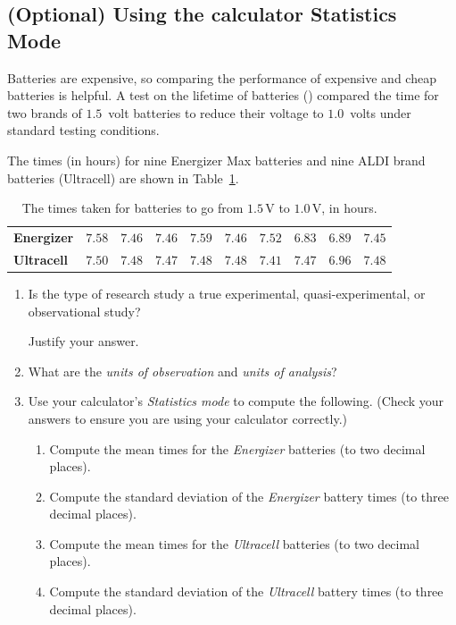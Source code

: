 \documentclass[
  11pt,
  a4paper,
  krantz2]{krantz}
\providecommand{\tightlist}{%
  \setlength{\itemsep}{0pt}\setlength{\parskip}{0pt}}
\newlength{\greyboxheight}
\newcommand{\setgreyboxheight}[1]{%
  \setlength{\greyboxheight}{2.3\baselineskip * #1}%
}
\newenvironment{greybox}[1]{%
  \nopagebreak
  \setgreyboxheight{#1}%
  \begin{tcolorbox}[
    colframe=gray!30!black,
    boxrule=2pt,
    width=\linewidth,
    height=\greyboxheight,
    valign=center,
    colback=white,
    left=4pt,
    right=4pt, 
    top=4pt, 
    bottom=4pt,
    before skip=4pt,
    after skip=4pt
  ]
\vspace*{\greyboxheight} %
}{%
  \end{tcolorbox}
  \goodbreak
}
\newcommand{\greyboxlines}[1]{\noindent\begin{greybox}{#1}\end{greybox}}
\begin{document}
\subsection{\texorpdfstring{\textbf{(Optional)} Using the calculator Statistics Mode}{(Optional) Using the calculator Statistics Mode}}\label{CalculatorBatteries}

Batteries are expensive, so comparing the performance of expensive and cheap batteries is helpful.
A test on the lifetime of batteries () compared the time for two brands of \(1.5\)~volt batteries to reduce their voltage to \(1.0\)~volts under standard testing conditions.

The times (in hours) for nine Energizer Max batteries and nine ALDI brand batteries (Ultracell) are shown in Table~\ref{tab:BattTable}.

\begin{table}
\centering
\caption{\label{tab:BattTable}The times taken for batteries to go from $1.5\,\text{V}$ to $1.0\,\text{V}$, in hours.}
\centering
\fontsize{10}{12}\selectfont
\begin{tabular}[t]{>{}llllllllll}
\toprule
\textbf{Energizer} & $7.58$ & $7.46$ & $7.46$ & $7.59$ & $7.46$ & $7.52$ & $6.83$ & $6.89$ & $7.45$\\
\textbf{Ultracell} & $7.50$ & $7.48$ & $7.47$ & $7.48$ & $7.48$ & $7.41$ & $7.47$ & $6.96$ & $7.48$\\
\bottomrule
\end{tabular}
\end{table}

\begin{enumerate}
\def\labelenumi{\arabic{enumi}.}
\item
  Is the type of research study a true experimental, quasi-experimental, or observational study?

  Justify your answer. \tightlist
  \greyboxlines{2}
\item
  What are the \emph{units of observation} and \emph{units of analysis}?
  \greyboxlines{2}
\item
  Use your calculator's \emph{Statistics mode} to compute the following. (Check your answers to ensure you are using your calculator correctly.)

  \begin{enumerate}
  \def\labelenumii{\alph{enumii}.}
  \item
    Compute the mean times for the \emph{Energizer} batteries (to two decimal places).
  \item
    Compute the standard deviation of the \emph{Energizer} battery times (to three decimal places).
  \item
    Compute the mean times for the \emph{Ultracell} batteries (to two decimal places).
  \item
    Compute the standard deviation of the \emph{Ultracell} battery times (to three decimal places).
  \end{enumerate}
\end{enumerate}
\end{document}
